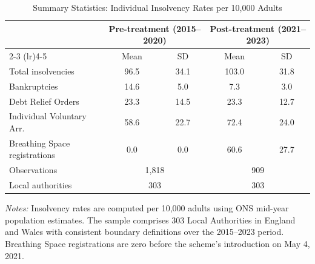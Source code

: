 \begin{table}[htbp]
\centering
\caption{Summary Statistics: Individual Insolvency Rates per 10,000 Adults}
\label{tab:summary}
\begin{tabular}{lcccc}
\hline\hline
 & \multicolumn{2}{c}{Pre-treatment (2015--2020)} & \multicolumn{2}{c}{Post-treatment (2021--2023)} \\
\cmidrule(lr){2-3} \cmidrule(lr){4-5}
 & Mean & SD & Mean & SD \\
\hline
Total insolvencies & 96.5 & 34.1 & 103.0 & 31.8 \\
\quad Bankruptcies & 14.6 & 5.0 & 7.3 & 3.0 \\
\quad Debt Relief Orders & 23.3 & 14.5 & 23.3 & 12.7 \\
\quad Individual Voluntary Arr. & 58.6 & 22.7 & 72.4 & 24.0 \\
Breathing Space registrations & 0.0 & 0.0 & 60.6 & 27.7 \\
\hline
Observations & \multicolumn{2}{c}{1,818} & \multicolumn{2}{c}{909} \\
Local authorities & \multicolumn{2}{c}{303} & \multicolumn{2}{c}{303} \\
\hline\hline
\end{tabular}
\begin{tablenotes}
\item \textit{Notes:} Insolvency rates are computed per 10,000 adults using ONS mid-year population estimates. The sample comprises 303 Local Authorities in England and Wales with consistent boundary definitions over the 2015--2023 period. Breathing Space registrations are zero before the scheme's introduction on May 4, 2021.
\end{tablenotes}
\end{table}

